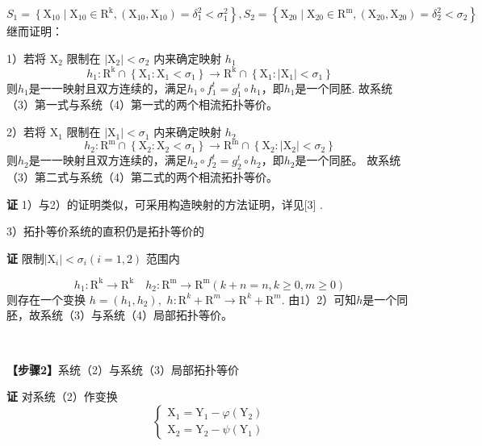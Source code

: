 \documentclass[12pt,a4paper,UTF8]{ctexart}
\begin{document}
$$S_1=\left\{\mathrm{X}_{10} \mid \mathrm{X}_{10} \in\right.
\left.\mathrm{R}^{\mathrm{k}},\left(\mathrm{X}_{10}, \mathrm{X}_{10}\right)=\delta_1^2<\sigma_1^2\right\} , S_2=\left\{\mathrm{X}_{20} \mid \mathrm{X}_{20} \in \mathrm{R}^{\mathrm{m}},\left(\mathrm{X}_{20}, \mathrm{X}_{20}\right)=\delta_2^2<\sigma_2\right\} $$
继而证明：

1）若将 $\mathrm{X}_2$ 限制在 $\left|\mathrm{X}_2\right|<\sigma_2$ 内来确定映射 $h_1$
$$
h_1: \mathrm{R}^{\mathrm{k}} \cap\left\{\mathrm{X}_1: \mathrm{X}_1<\sigma_1\right\} \rightarrow \mathrm{R}^{\mathrm{k}} \cap\left\{\mathrm{X}_1:\left|\mathrm{X}_1\right|<\sigma_1\right\}
$$
则$h_1$是一一映射且双方连续的，满足$h_1 \circ f_1^t=g_1^t \circ h_1$，即$h_1$是一个同胚.
故系统（3）第一式与系统（4）第一式的两个相流拓扑等价。

2）若将 $\mathrm{X}_1$ 限制在 $\left|\mathrm{X}_1\right|<\sigma_1$ 内来确定映射 $h_2$
$$
h_2: \mathrm{R}^{\mathrm{m}} \cap\left\{\mathrm{X}_2: \mathrm{X}_2<\sigma_1\right\} \rightarrow \mathrm{R}^{\mathrm{m}} \cap\left\{\mathrm{X}_2:\left|\mathrm{X}_2\right|<\sigma_2\right\}
$$
则$h_2$是一一映射且双方连续的，满足$h_2 \circ f_2^t=g_2^t \circ h_2$，即$h_2$是一个同胚。
故系统（3）第二式与系统（4）第二式的两个相流拓扑等价。

\textbf{证 }1）与2）的证明类似，可采用构造映射的方法证明，详见[3] .

3）拓扑等价系统的直积仍是拓扑等价的

\textbf{证 } 限制$\left|\mathrm{X}_i\right|<\sigma_i(i=1,2)$ 范围内

$$h_1: \mathrm{R}^{\mathrm{k}} \rightarrow \mathrm{R}^{\mathrm{k}} \quad h_2: \mathrm{R}^{\mathrm{m}} \rightarrow \mathrm{R}^{\mathrm{m}}\left(k+n=n, k \geq 0, m \geq 0\right)$$
则存在一个变换 $h=\left(h_1, h_2\right),$ $h: \mathrm{R}^k+\mathrm{R}^m \rightarrow \mathrm{R}^k+\mathrm{R}^m$.
由1）2）可知$h$是一个同胚，故系统（3）与系统（4）局部拓扑等价。


\begin{spacing}{1.3}
	~
\end{spacing}
\textbf{【步骤2】}系统（2）与系统（3）局部拓扑等价

\textbf{证 }对系统（2）作变换
$$
\left\{\begin{array}{l}
\mathrm{X}_1=\mathrm{Y}_1-\varphi\left(\mathrm{Y}_2\right) \\
\mathrm{X}_2=\mathrm{Y}_2-\psi\left(\mathrm{Y}_1\right)
\end{array}\right.
$$
\end{document}
